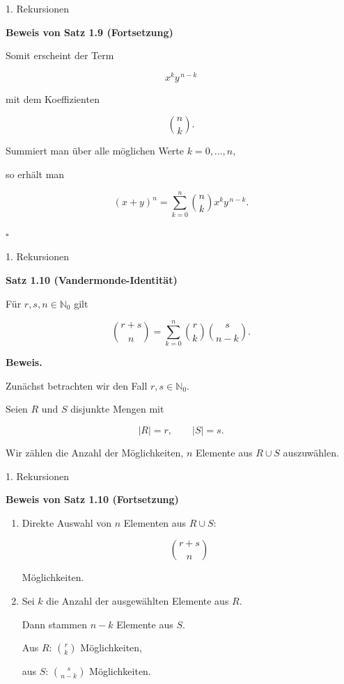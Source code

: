 \documentclass{beamer}
\begin{document}
\begin{frame}{1. Rekursionen}

\textbf{Beweis von Satz 1.9 (Fortsetzung)}

\vspace{0.3cm}

Somit erscheint der Term

\[
x^k y^{\,n-k}
\]

mit dem Koeffizienten

\[
\binom{n}{k}.
\]

\vspace{0.4cm}

Summiert man über alle möglichen Werte \(k=0,\dots,n,\)

so erhält man

\[
(x+y)^n
=
\sum_{k=0}^{n}
\binom{n}{k}
x^k y^{\,n-k}.
\]

\hfill\(\square\)

\end{frame}

\begin{frame}{1. Rekursionen}

\textbf{Satz 1.10 (Vandermonde-Identität)}

\vspace{0.2cm}

Für \(r,s,n\in\mathbb N_0\) gilt

\[
\binom{r+s}{n}
=
\sum_{k=0}^{n}
\binom{r}{k}
\binom{s}{n-k}.
\]

\vspace{0.3cm}

\textbf{Beweis.}

Zunächst betrachten wir den Fall
\(r,s\in\mathbb N_0\).

Seien \(R\) und \(S\) disjunkte Mengen mit

\[
|R|=r,\qquad |S|=s.
\]

Wir zählen die Anzahl der Möglichkeiten,
\(n\) Elemente aus \(R\cup S\) auszuwählen.

\end{frame}

\begin{frame}{1. Rekursionen}

\textbf{Beweis von Satz 1.10 (Fortsetzung)}

\begin{enumerate}
\item Direkte Auswahl von \(n\) Elementen aus \(R\cup S\):

\[
\binom{r+s}{n}
\]

Möglichkeiten.

\vspace{0.2cm}

\item Sei \(k\) die Anzahl der ausgewählten Elemente aus \(R\).

Dann stammen \(n-k\) Elemente aus \(S\).

Aus \(R\): \(\binom{r}{k}\) Möglichkeiten,

aus \(S\): \(\binom{s}{n-k}\) Möglichkeiten.

\end{enumerate}

\end{frame}
\end{document}
